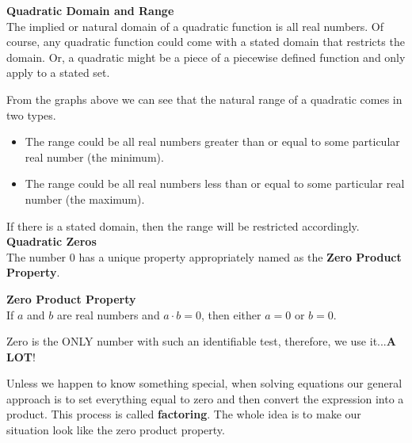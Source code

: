 \documentclass{ximera}
\begin{document}
\textbf{\textcolor{blue!75!black}{Quadratic Domain and Range}} \\


The implied or natural domain of a quadratic function is all real numbers.  Of course, any quadratic function could come with a stated domain that restricts the domain. Or, a quadratic might be a piece of a piecewise defined function and only apply to a stated set.

From the graphs above we can see that the natural range of a quadratic comes in two types.  

\begin{itemize}
\item The range could be all real numbers greater than or equal to some particular real number (the minimum).
\item The range could be all real numbers less than or equal to some particular real number (the maximum).
\end{itemize}

If there is a stated domain, then the range will be restricted accordingly. \\





\textbf{\textcolor{blue!75!black}{Quadratic Zeros}} \\

The number $0$ has a unique property appropriately named as the \textbf{Zero Product Property}.  



\begin{definition}  \textbf{\textcolor{green!50!black}{Zero Product Property}} \\

If $a$ and $b$ are real numbers and $a\cdot b = 0$, then either $a=0$ or $b=0$.

\end{definition}


Zero is the ONLY number with such an identifiable test, therefore, we use it...\textbf{\textcolor{purple!85!blue}{A LOT}}! 


\begin{procedure}


Unless we happen to know something special, when solving equations our general approach is to set everything equal to zero and then convert the expression into a product.  This process is called \textbf{factoring}.  The whole idea is to make our situation look like the zero product property.

\end{procedure}
\end{document}

